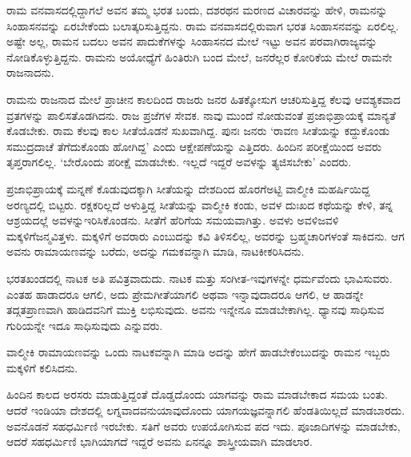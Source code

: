ರಾಮ ವನವಾಸದಲ್ಲಿದ್ದಾಗಲೆ ಅವನ ತಮ್ಮ ಭರತ ಬಂದು, ದಶರಥನ ಮರಣದ ವಿಚಾರವನ್ನು ಹೇಳಿ, ರಾಮನನ್ನು ಸಿಂಹಾಸನವನ್ನು ಏರಬೇಕೆಂದು ಬಲಾತ್ಕರಿಸುತ್ತಿದ್ದನು. ರಾಮ ವನವಾಸದಲ್ಲಿರುವಾಗ ಭರತ ಸಿಂಹಾಸನವನ್ನು ಏರಲಿಲ್ಲ. ಅಷ್ಟೇ ಅಲ್ಲ, ರಾಮನ ಬದಲು ಅವನ ಪಾದುಕೆಗಳನ್ನು ಸಿಂಹಾಸನದ ಮೇಲೆ ಇಟ್ಟು ಅವನ ಪರವಾಗಿ\break ರಾಜ್ಯವನ್ನು ನೋಡಿಕೊಳ್ಳುತ್ತಿದ್ದನು. ರಾಮನು ಅಯೋಧ್ಯೆಗೆ ಹಿಂತಿರುಗಿ ಬಂದ ಮೇಲೆ, ಜನರೆಲ್ಲರ ಕೋರಿಕೆಯ ಮೇಲೆ ರಾಮನೇ ರಾಜನಾದನು.

ರಾಮನು ರಾಜನಾದ ಮೇಲೆ ಪ್ರಾಚೀನ ಕಾಲದಿಂದ ರಾಜರು ಜನರ ಹಿತಕ್ಕೋಸುಗ ಆಚರಿಸುತ್ತಿದ್ದ ಕೆಲವು ಆವಶ್ಯಕವಾದ ವ್ರತಗಳನ್ನು ಪಾಲಿಸತೊಡಗಿದನು. ರಾಜ ಪ್ರಜೆಗಳ ಸೇವಕ. ನಾವು ಮುಂದೆ ನೋಡುವಂತೆ ಪ್ರಜಾಭಿಪ್ರಾಯಕ್ಕೆ ಮಾನ್ಯತೆ ಕೊಡಬೇಕು. ರಾಮ ಕೆಲವು ಕಾಲ ಸೀತೆಯೊಡನೆ ಸುಖವಾಗಿದ್ದ. ಪುನಃ ಜನರು ‘ರಾವಣ ಸೀತೆಯನ್ನು ಕದ್ದುಕೊಂಡು ಸಮುದ್ರದಾಚೆ ತೆಗೆದುಕೊಂಡು ಹೋಗಿದ್ದ’ ಎಂದು ಆಕ್ಷೇಪಣೆಯನ್ನು ಎತ್ತಿದರು. ಹಿಂದಿನ ಪರೀಕ್ಷೆಯಿಂದ ಅವರು ತೃಪ್ತರಾಗಲಿಲ್ಲ. ‘ಬೇರೊಂದು ಪರೀಕ್ಷೆ ಮಾಡಬೇಕು. ಇಲ್ಲದೆ ಇದ್ದರೆ ಅವಳನ್ನು ತ್ಯಜಿಸಬೇಕು’ ಎಂದರು.

ಪ್ರಜಾಭಿಪ್ರಾಯಕ್ಕೆ ಮನ್ನಣೆ ಕೊಡುವುದಕ್ಕಾಗಿ ಸೀತೆಯನ್ನು ದೇಶದಿಂದ ಹೊರಗೆ\break ಅಟ್ಟಿ ವಾಲ್ಮೀಕಿ ಮಹರ್ಷಿಯಿದ್ದ ಅರಣ್ಯದಲ್ಲಿ ಬಿಟ್ಟರು. ರಕ್ಷಕರಿಲ್ಲದೆ ಅಳುತ್ತಿದ್ದ ಸೀತೆಯನ್ನು ವಾಲ್ಮೀಕಿ ಕಂಡು, ಅವಳ ದುಃಖದ ಕಥೆಯನ್ನು ಕೇಳಿ, ತನ್ನ ಆಶ್ರಯದಲ್ಲೆ ಅವಳನ್ನು\break ಇರಿಸಿಕೊಂಡನು. ಸೀತೆಗೆ ಹೆರಿಗೆಯ ಸಮಯವಾಗಿತ್ತು. ಅವಳು ಅವಳಿಜವಳಿ ಮಕ್ಕಳಿಗೆ\break ಜನ್ಮವಿತ್ತಳು. ಮಕ್ಕಳಿಗೆ ಅವರಾರು ಎಂಬುದನ್ನು ಕವಿ ತಿಳಿಸಲಿಲ್ಲ, ಅವರನ್ನು ಬ್ರಹ್ಮಚಾರಿಗಳಂತೆ ಸಾಕಿದನು. ಆಗ ಅವನು ರಾಮಾಯಣವನ್ನು ಬರೆದು, ಅದನ್ನು ಗಮಕವನ್ನಾಗಿ ಮಾಡಿ, ನಾಟಕೀಕರಿಸಿದನು.

ಭರತಖಂಡದಲ್ಲಿ ನಾಟಕ ಅತಿ ಪವಿತ್ರವಾದುದು. ನಾಟಕ ಮತ್ತು ಸಂಗೀತ-ಇವುಗಳನ್ನೇ ಧರ್ಮವೆಂದು ಭಾವಿಸುವರು. ಎಂತಹ ಹಾಡಾದರೂ ಆಗಲಿ, ಅದು ಪ್ರೇಮಗೀತೆಯಾಗಲಿ ಅಥವಾ ಇನ್ನಾವುದಾದರೂ ಆಗಲಿ, ಆ ಹಾಡನ್ನೇ ತದ್ಗತಪ್ರಾಣವಾಗಿ ಹಾಡಿದವನಿಗೆ ಮುಕ್ತಿ ಲಭಿಸುವುದು. ಅವನು ಇನ್ನೇನೂ ಮಾಡಬೇಕಾಗಿಲ್ಲ. ಧ್ಯಾನವು ಸಾಧಿಸುವ ಗುರಿಯನ್ನೇ ಇದೂ ಸಾಧಿಸುವುದು ಎನ್ನುವರು.

ವಾಲ್ಮೀಕಿ ರಾಮಾಯಣವನ್ನು ಒಂದು ನಾಟಕವನ್ನಾಗಿ ಮಾಡಿ ಅದನ್ನು ಹೇಗೆ ಹಾಡ\-ಬೇಕೆಂಬುದನ್ನು ರಾಮನ ಇಬ್ಬರು ಮಕ್ಕಳಿಗೆ ಕಲಿಸಿದನು.

ಹಿಂದಿನ ಕಾಲದ ಅರಸರು ಮಾಡುತ್ತಿದ್ದಂತೆ ದೊಡ್ಡದೊಂದು ಯಾಗವನ್ನು ರಾಮ ಮಾಡಬೇಕಾದ ಸಮಯ ಬಂತು. ಆದರೆ ಇಂಡಿಯಾ ದೇಶದಲ್ಲಿ ಲಗ್ನವಾದವನು\break ಯಾವುದೊಂದು ಯಾಗಯಜ್ಞವನ್ನಾಗಲಿ ಹೆಂಡತಿಯಿಲ್ಲದೆ ಮಾಡಬಾರದು. ಅವನೊಡನೆ ಸಹಧರ್ಮಿಣಿ ಇರಬೇಕು. ಸತಿಗೆ ಅವರು ಉಪಯೋಗಿಸುವ ಪದ ಇದು. ಪೂಜಾದಿಗಳನ್ನು ಮಾಡಬೇಕು, ಆದರೆ ಸಹಧರ್ಮಿಣಿ ಭಾಗಿಯಾಗದೆ ಇದ್ದರೆ ಅವನು ಏನನ್ನೂ ಶಾಸ್ತ್ರೀಯವಾಗಿ ಮಾಡಲಾರ.

